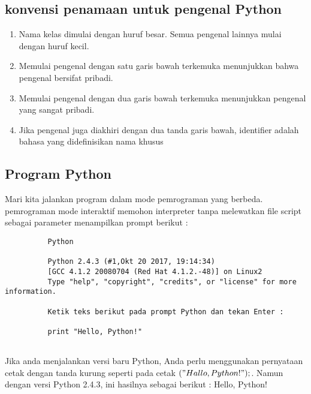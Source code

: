 \subsection{konvensi penamaan untuk pengenal Python}
\begin{enumerate}
    \item Nama kelas dimulai dengan huruf besar. Semua pengenal lainnya mulai dengan huruf kecil.
    \item Memulai pengenal dengan satu garis bawah terkemuka menunjukkan bahwa pengenal bersifat pribadi.
    \item Memulai pengenal dengan dua garis bawah terkemuka menunjukkan pengenal yang sangat pribadi.
    \item Jika pengenal juga diakhiri dengan dua tanda garis bawah, identifier adalah bahasa yang didefinisikan nama khusus
\end{enumerate}


\subsection{Program Python}
Mari kita jalankan program dalam mode pemrograman yang berbeda. pemrograman mode interaktif memohon interpreter tanpa melewatkan file script sebagai parameter menampilkan prompt berikut :
    \begin{verbatim}
          Python
          
          Python 2.4.3 (#1,Okt 20 2017, 19:14:34)
          [GCC 4.1.2 20080704 (Red Hat 4.1.2.-48)] on Linux2
          Type "help", "copyright", "credits", or "license" for more information.
          
          Ketik teks berikut pada prompt Python dan tekan Enter :
          
          print "Hello, Python!"
          
     \end{verbatim}
Jika anda menjalankan versi baru Python, Anda perlu menggunakan pernyataan cetak dengan tanda kurung seperti pada cetak $("Hallo, Python!");$. Namun dengan versi Python 2.4.3, ini hasilnya sebagai berikut :
Hello, Python!


